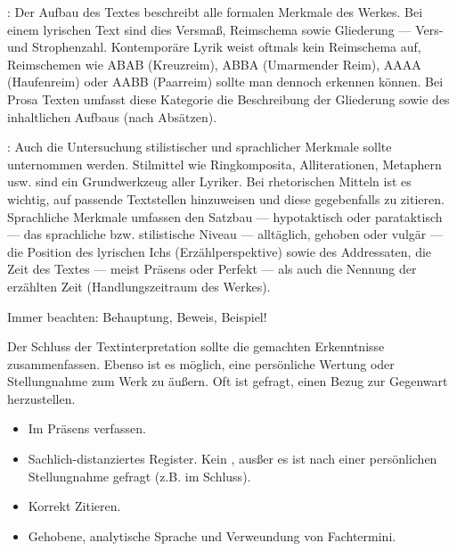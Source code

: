 \begin{enumerate}
\begin{itemize}
\pagebreak

			: Der Aufbau des Textes beschreibt alle formalen Merkmale des Werkes. Bei einem lyrischen Text sind dies Versma\ss{}, Reimschema sowie Gliederung --- Vers- und Strophenzahl. Kontempor\"{a}re Lyrik weist oftmals kein Reimschema auf, Reimschemen wie ABAB (Kreuzreim), ABBA (Umarmender Reim), AAAA (Haufenreim) oder AABB (Paarreim) sollte man dennoch erkennen k\"{o}nnen. Bei Prosa Texten umfasst diese Kategorie die Beschreibung der Gliederung sowie des inhaltlichen Aufbaus (nach Abs\"{a}tzen).

			: Auch die Untersuchung stilistischer und sprachlicher Merkmale sollte unternommen werden. Stilmittel wie Ringkomposita, Alliterationen, Metaphern usw. sind ein Grundwerkzeug aller Lyriker. Bei rhetorischen Mitteln ist es wichtig, auf passende Textstellen hinzuweisen und diese gegebenfalls zu zitieren. Sprachliche Merkmale umfassen den Satzbau --- hypotaktisch oder parataktisch --- das sprachliche bzw. stilistische Niveau --- allt\"{a}glich, gehoben oder vulg\"{a}r --- die Position des lyrischen Ichs (Erz\"{a}hlperspektive) sowie des Addressaten, die Zeit des Textes --- meist Pr\"{a}sens oder Perfekt --- als auch die Nennung der erz\"{a}hlten Zeit (Handlungszeitraum des Werkes).
		\end{itemize}

		Immer beachten: Behauptung, Beweis, Beispiel!


		Der Schluss der Textinterpretation sollte die gemachten Erkenntnisse zusammenfassen. Ebenso ist es m\"{o}glich, eine pers\"{o}nliche Wertung oder Stellungnahme zum Werk zu \"{a}u\ss{}ern. Oft ist gefragt, einen Bezug zur Gegenwart herzustellen.
\end{enumerate}


\begin{itemize}

	\item Im Pr\"{a}sens verfassen.

	\item Sachlich-distanziertes Register. Kein , aus\ss{}er es ist nach einer pers\"{o}nlichen Stellungnahme gefragt (z.B. im Schluss).

	\item Korrekt Zitieren.

	\item Gehobene, analytische Sprache und Verweundung von Fachtermini.

\end{itemize}

